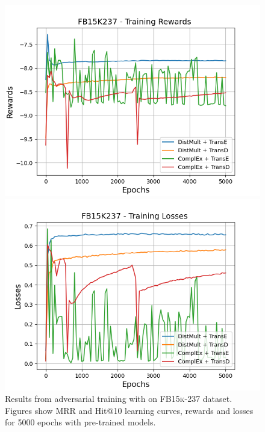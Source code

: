\begin{figure}
    \begin{minipage}{.5\textwidth}
      \centering
      \includegraphics[width=\linewidth]{figures/results/gan_train/pretrained/uncertainty/max/entropy/fb15k237/5k_epochs/uncertainty_fb15k237_rew.png}
    \end{minipage}%
     \begin{minipage}{.5\textwidth}
      \centering
      \includegraphics[width=\linewidth]{figures/results/gan_train/pretrained/uncertainty/max/entropy/fb15k237/5k_epochs/uncertainty_fb15k237_losses.png}
    \end{minipage}%
    \caption{Results from adversarial training with \usmax on \textsc{FB15k-237} dataset.
    Figures show MRR and Hit@10 learning curves, rewards and losses for 5000 epochs with pre-trained models.}
    \label{fig:gan_train_pretrained_usmax_fb15k237}
\end{figure}
